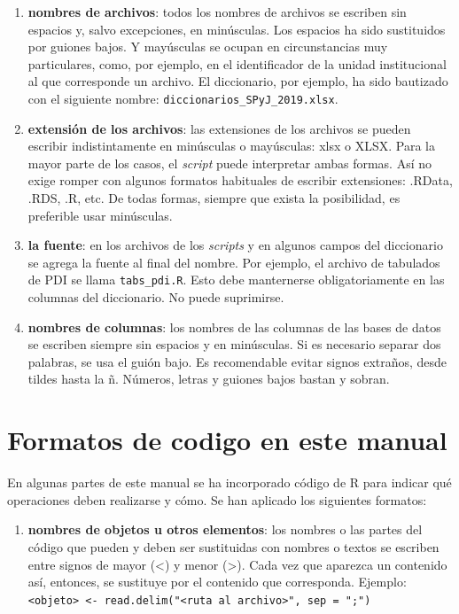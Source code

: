 \documentclass[
  spanish,
]{book}
\providecommand{\tightlist}{%
  \setlength{\itemsep}{0pt}\setlength{\parskip}{0pt}}
\begin{document}
\begin{enumerate}
\def\labelenumi{\alph{enumi})}
\item
  \textbf{nombres de archivos}: todos los nombres de archivos se escriben sin espacios y, salvo excepciones, en minúsculas. Los espacios ha sido sustituidos por guiones bajos. Y mayúsculas se ocupan en circunstancias muy particulares, como, por ejemplo, en el identificador de la unidad institucional al que corresponde un archivo. El diccionario, por ejemplo, ha sido bautizado con el siguiente nombre: \texttt{diccionarios\_SPyJ\_2019.xlsx}.
\item
  \textbf{extensión de los archivos}: las extensiones de los archivos se pueden escribir indistintamente en minúsculas o mayúsculas: xlsx o XLSX. Para la mayor parte de los casos, el \emph{script} puede interpretar ambas formas. Así no exige romper con algunos formatos habituales de escribir extensiones: .RData, .RDS, .R, etc. De todas formas, siempre que exista la posibilidad, es preferible usar minúsculas.
\item
  \textbf{la fuente}: en los archivos de los \emph{scripts} y en algunos campos del diccionario se agrega la fuente al final del nombre. Por ejemplo, el archivo de tabulados de PDI se llama \texttt{tabs\_pdi.R}. Esto debe manternerse obligatoriamente en las columnas del diccionario. No puede suprimirse.
\item
  \textbf{nombres de columnas}: los nombres de las columnas de las bases de datos se escriben siempre sin espacios y en minúsculas. Si es necesario separar dos palabras, se usa el guión bajo. Es recomendable evitar signos extraños, desde tildes hasta la ñ. Números, letras y guiones bajos bastan y sobran.
\end{enumerate}

\hypertarget{formatos_manual}{%
\section{Formatos de codigo en este manual}\label{formatos_manual}}

En algunas partes de este manual se ha incorporado código de R para indicar qué operaciones deben realizarse y cómo. Se han aplicado los siguientes formatos:

\begin{enumerate}
\def\labelenumi{\alph{enumi})}
\tightlist
\item
  \textbf{nombres de objetos u otros elementos}: los nombres o las partes del código que pueden y deben ser sustituidas con nombres o textos se escriben entre signos de mayor (\textless) y menor (\textgreater). Cada vez que aparezca un contenido así, entonces, se sustituye por el contenido que corresponda. Ejemplo: \texttt{\textless{}objeto\textgreater{}\ \textless{}-\ read.delim("\textless{}ruta\ al\ archivo\textgreater{}",\ sep\ =\ ";")}
\end{enumerate}
\end{document}
